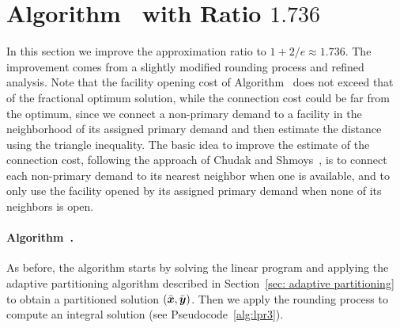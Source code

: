 

\section{Algorithm~{\ECHS} with Ratio $1.736$}\label{sec: 1.736-approximation}

In this section we improve the approximation ratio to $1+2/e \approx
1.736$. The improvement comes from a slightly modified rounding
process and refined analysis.  Note that the facility opening cost of
Algorithm~{\EGUP} does not exceed that of the fractional optimum
solution, while the connection cost could be far from the optimum,
since we connect a non-primary demand to a facility in the neighborhood of
its assigned primary demand and then estimate the distance using the
triangle inequality. The basic idea to improve the estimate of the connection cost,
following the approach of Chudak and Shmoys~\cite{ChudakS04}, 
is to connect each non-primary demand to its
nearest neighbor when one is available, and to only use the facility opened by
its assigned primary demand when none of its neighbors is open.


\paragraph{Algorithm~{\ECHS}.}
As before,
the algorithm starts by solving the linear program and applying the
adaptive partitioning algorithm  described in 
Section~\ref{sec: adaptive partitioning} to obtain a partitioned
solution $(\bar{\boldsymbol{x}}, \bar{\boldsymbol{y}})$. Then we apply the rounding
process to compute an integral solution (see Pseudocode~\ref{alg:lpr3}).  


